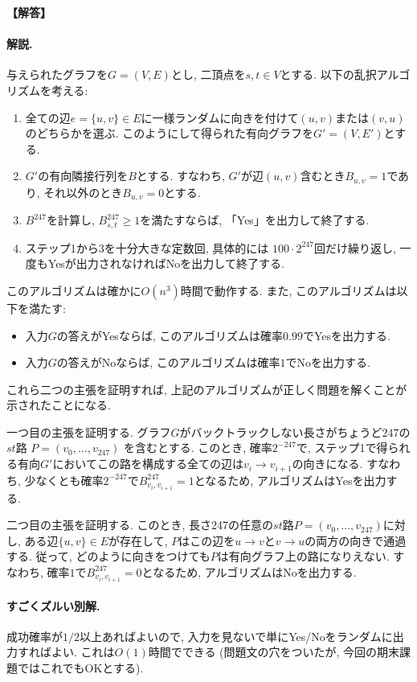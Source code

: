 \documentclass[12pt,a4paper]{article}
\newenvironment{solution}{
    \vspace{0.5em}
    \begin{tcolorbox}[colback=white, colframe=black, boxrule=1pt, arc=0mm, breakable]
    \noindent
    \textbf{【解答】}
    \vspace{0.3em}
}{
    \end{tcolorbox}
    \vspace{1em}
}
\begin{document}
\begin{solution}
  \paragraph*{解説.}
  与えられたグラフを$G=(V,E)$とし, 二頂点を$s,t\in V$とする.
  以下の乱択アルゴリズムを考える:
  \begin{enumerate}
    \item 全ての辺$e=\{u,v\}\in E$に一様ランダムに向きを付けて$(u,v)$または$(v,u)$のどちらかを選ぶ. このようにして得られた有向グラフを$G'=(V,E')$とする.
    \item $G'$の有向隣接行列を$B$とする. すなわち, $G'$が辺$(u,v)$含むとき$B_{u,v}=1$であり, それ以外のとき$B_{u,v}=0$とする.
    \item $B^{247}$を計算し, $B^{247}_{s,t}\ge 1$を満たすならば, 「Yes」を出力して終了する.
    \item ステップ1から3を十分大きな定数回, 具体的には $100\cdot 2^{247}$回だけ繰り返し, 一度もYesが出力されなければNoを出力して終了する.
  \end{enumerate}
  このアルゴリズムは確かに$O(n^3)$時間で動作する. また, このアルゴリズムは以下を満たす:
  \begin{itemize}
    \item 入力$G$の答えがYesならば, このアルゴリズムは確率$0.99$でYesを出力する.
    \item 入力$G$の答えがNoならば, このアルゴリズムは確率$1$でNoを出力する.
  \end{itemize}
  これら二つの主張を証明すれば, 上記のアルゴリズムが正しく問題を解くことが示されたことになる.
  
  一つ目の主張を証明する. グラフ$G$がバックトラックしない長さがちょうど$247$の$st$路 $P=(v_0,\dots,v_{247})$ を含むとする. このとき, 確率$2^{-247}$で, ステップ1で得られる有向$G'$においてこの路を構成する全ての辺は$v_i \to v_{i+1}$の向きになる. すなわち, 少なくとも確率$2^{-247}$で$B^{247}_{v_i,v_{i+1}}=1$となるため, アルゴリズムはYesを出力する.

  二つ目の主張を証明する. このとき, 長さ247の任意の$st$路$P=(v_0,\dots,v_{247})$に対し, ある辺$\{u,v\}\in E$が存在して, $P$はこの辺を$u\to v$と$v \to u$の両方の向きで通過する. 従って, どのように向きをつけても$P$は有向グラフ上の路になりえない. すなわち, 確率$1$で$B^{247}_{v_i,v_{i+1}}=0$となるため, アルゴリズムはNoを出力する.

  \paragraph*{すごくズルい別解.} 成功確率が$1/2$以上あればよいので, 入力を見ないで単にYes/Noをランダムに出力すればよい. これは$O(1)$時間でできる (問題文の穴をついたが, 今回の期末課題ではこれでもOKとする).
\end{solution}
\end{document}
